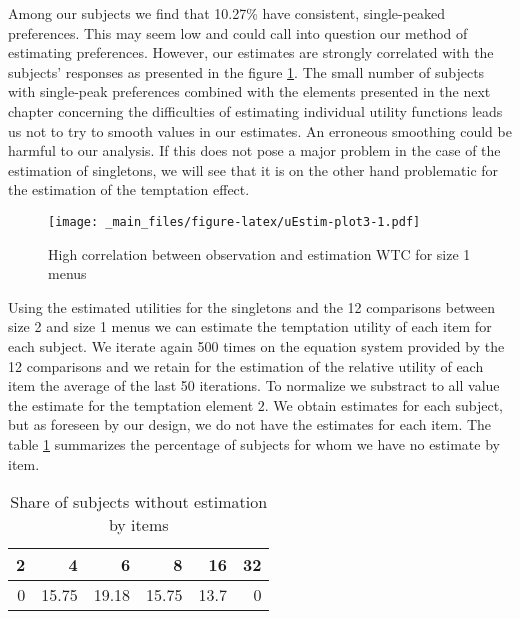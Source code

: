 \documentclass[
]{book}
\begin{document}
Among our subjects we find that
10.27\% have consistent, single-peaked
preferences.
This may seem low and could call into question our method of estimating
preferences.
However, our estimates are strongly correlated with the subjects' responses as
presented in the figure \ref{fig:uEstim-plot3}.
The small number of subjects with single-peak preferences combined with the
elements presented in the next chapter concerning the difficulties of estimating
individual utility functions leads us not to try to smooth values in our
estimates.
An erroneous smoothing could be harmful to our analysis.
If this does not pose a major problem in the case of the estimation of
singletons, we will see that it is on the other hand problematic for the
estimation of the temptation effect.

\begin{figure}
\centering
\texttt{[image: \_main\_files/figure-latex/uEstim-plot3-1.pdf]}
\caption{\label{fig:uEstim-plot3}High correlation between observation and estimation WTC for size 1 menus}
\end{figure}

Using the estimated utilities for the singletons and the 12 comparisons between
size 2 and size 1 menus we can estimate the temptation utility of each item for
each subject.
We iterate again 500 times on the equation system provided by the 12 comparisons
and we retain for the estimation of the relative utility of each item the
average of the last 50 iterations.
To normalize we substract to all value the estimate for the temptation element
\(2\).
We obtain estimates for each subject, but as foreseen by our design, we do not
have the estimates for each item.
The table \ref{tab:no-estim3} summarizes the percentage of subjects for whom we have no
estimate by item.

\begin{table}

\caption{\label{tab:no-estim3}Share of subjects without estimation by items}
\centering
\begin{tabular}[t]{r|r|r|r|r|r}
\hline
2 & 4 & 6 & 8 & 16 & 32\\
\hline
0 & 15.75 & 19.18 & 15.75 & 13.7 & 0\\
\hline
\end{tabular}
\end{table}
\end{document}
